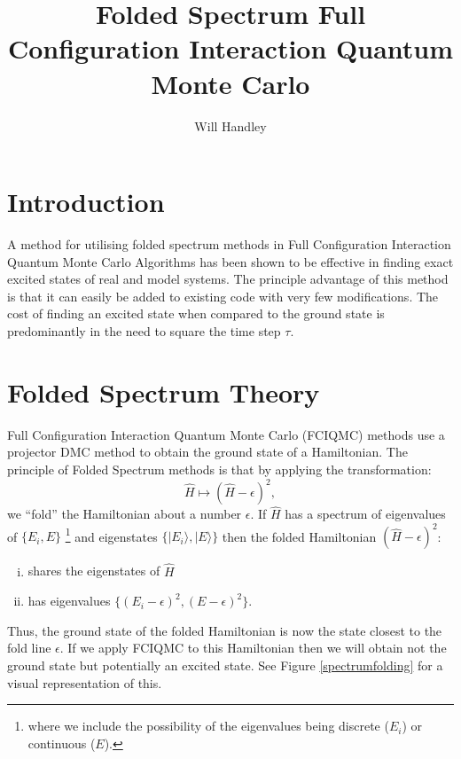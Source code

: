 \documentclass{article}
\newcommand{\ket}[1]{|#1\rangle}
\begin{document}
\title{Folded Spectrum Full Configuration Interaction Quantum Monte Carlo}
\author{Will Handley}
\maketitle
\section{Introduction}
A method for utilising folded spectrum methods in Full Configuration Interaction Quantum Monte Carlo Algorithms has been shown to be effective in finding exact excited states of real and model systems. The principle advantage of this method is that it can easily be added to existing code with very few modifications. The cost of finding an excited state when compared to the ground state is predominantly in the need to square the time step $\tau$. 





\section{Folded Spectrum Theory}
Full Configuration Interaction Quantum Monte Carlo (FCIQMC) methods use a projector DMC method to obtain the ground state of a Hamiltonian. The principle of Folded Spectrum methods is that by applying the transformation:
\begin{equation}
\hat{H} \longmapsto (\hat{H} - \epsilon )^2,
\end{equation}
we ``fold'' the Hamiltonian about a number $\epsilon$. If $\hat{H}$ has a spectrum of eigenvalues of $\{E_{i},E\}$
\footnote{where we include the possibility of the eigenvalues being discrete ($E_{i}$) or continuous ($E$).}
and eigenstates $\{\ket{E_{i}},\ket{E}\}$ then the folded Hamiltonian $(\hat{H} - \epsilon )^2$:
\begin{enumerate}[(i)]
\item shares the eigenstates of $\hat{H}$
\item has eigenvalues $\{(E_{i}-\epsilon)^2,(E-\epsilon)^2\}$.
\end{enumerate}
Thus, the ground state of the folded Hamiltonian is now the state closest to the fold line $\epsilon$. If we apply FCIQMC to this Hamiltonian then we will obtain not the ground state but potentially an excited state. See Figure \ref{spectrumfolding} for a visual representation of this.
\end{document}
